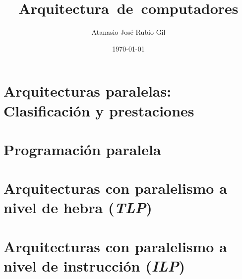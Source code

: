 \documentclass[10pt, a4paper]{aqademic}
\author{Atanasio José Rubio Gil}
\title{Arquitectura~de~computadores}
\date{\today}
\begin{document}
\AqMaketitle[cover    = logo-ugr.png,
             org      = Grado en Ingeniería Informática,
             subtitle = Teoría,
             url      = https://github.com/Groctel/ugr-informatica]
\tableofcontents

\chapter{Arquitecturas paralelas: Clasificación y prestaciones}\label{arqpar-clasificacion-prestaciones}
	
	
	

\chapter{Programación paralela}\label{progpar}
	
	
	

\chapter{Arquitecturas con paralelismo a nivel de hebra (\textit{TLP})}\label{tlp}

\chapter{Arquitecturas con paralelismo a nivel de instrucción (\textit{ILP})}\label{ilp}
\end{document}
